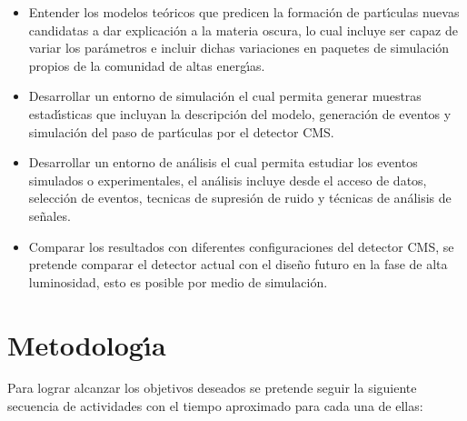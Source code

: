 \begin{itemize}
\item Entender los modelos te\'oricos que predicen la formaci\'on de part\'{\i}culas nuevas candidatas a dar explicaci\'on a la materia oscura, lo cual incluye ser capaz de variar los par\'ametros e incluir dichas variaciones en paquetes de simulaci\'on propios de la comunidad de altas energ\'{\i}as. 
\item Desarrollar un entorno de simulaci\'on el cual permita generar muestras estad\'{\i}sticas que incluyan la descripci\'on del modelo, generaci\'on de eventos y simulaci\'on del paso de part\'{\i}culas por el detector CMS. 
 \item Desarrollar un entorno de an\'alisis el cual permita estudiar los eventos simulados o experimentales, el an\'alisis incluye desde el acceso de datos, selecci\'on de eventos, tecnicas de supresi\'on de ruido y t\'ecnicas de an\'alisis de se\~nales. 
\item Comparar los resultados con diferentes configuraciones del detector CMS, se pretende comparar el detector actual con el dise\~no futuro en la fase de alta luminosidad, esto es posible por medio de simulaci\'on. 
  
\end{itemize}


\chapter{Metodolog\'{\i}a}

Para lograr alcanzar los objetivos deseados se pretende seguir la siguiente secuencia de actividades con el tiempo aproximado para cada una de ellas:

